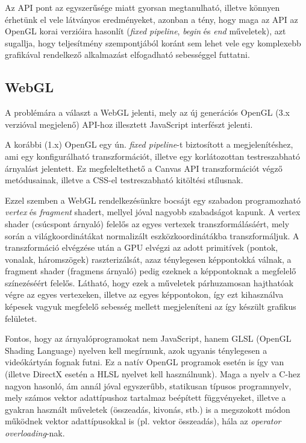 Az API pont az egyszerűsége miatt gyorsan megtanulható, illetve könnyen érhetünk
el vele látványos eredményeket, azonban a tény, hogy maga az API az OpenGL korai
verzióira hasonlít (\emph{fixed pipeline}, \emph{begin} és \emph{end}
műveletek), azt sugallja, hogy teljesítmény szempontjából koránt sem lehet vele
egy komplexebb grafikával rendelkező alkalmazást elfogadható sebességgel
futtatni.

\subsection{WebGL}

A problémára a választ a WebGL\cite{webgl} jelenti, mely az új generációs OpenGL
(3.x verzióval megjelenő) API-hoz illesztett JavaScript interfészt jelenti.

A korábbi (1.x) OpenGL egy ún. \emph{fixed pipeline}-t biztosított a
megjelenítéshez, ami egy konfigurálható transzformációt, illetve egy
korlátozottan testreszabható árnyalást jelentett. Ez megfeleltethető a Canvas
API transzformációt végző metódusainak, illetve a CSS-el testreszabható
kitöltési stílusnak.

Ezzel szemben a WebGL rendelkezésünkre bocsájt egy szabadon programozható
\emph{vertex} és \emph{fragment} shadert, mellyel jóval nagyobb szabadságot
kapunk. A vertex shader (csúcspont árnyaló) felelős az egyes vertexek
transzformálásáért, mely során a világkoordinátákat normalizált
eszközkoordinátákba transzformáljuk. A transzformáció elvégzése után a GPU
elvégzi az adott primitívek (pontok, vonalak, háromszögek) raszterizálsát, azaz
ténylegesen képpontokká válnak, a fragment shader (fragmens árnyaló) pedig
ezeknek a képpontoknak a megfelelő színezéséért felelős. Látható, hogy ezek a
műveletek párhuzamosan hajthatóak végre az egyes vertexeken, illetve az egyes
képpontokon, így ezt kihasználva képesek vagyuk megfelelő sebesség mellett
megjeleníteni az így készült grafikus felületet.

Fontos, hogy az árnyalóprogramokat nem JavaScript, hanem GLSL (OpenGL Shading
Language\cite{glsl}) nyelven kell megírnunk, azok ugyanis ténylegesen a
videókártyán fognak futni. Ez a natív OpenGL programok esetén is így van
(illetve DirectX esetén a HLSL nyelvet kell használnunk\cite{hlsl}). Maga a
nyelv a C-hez nagyon hasonló, ám annál jóval egyszerűbb, statikusan típusos
programnyelv, mely számos vektor adattípushoz tartalmaz beépített függvényeket,
illetve a gyakran használt műveletek (összeadás, kivonás, stb.) is a megszokott
módon működnek vektor adattípusokkal is (pl. vektor összeadás), hála az
\emph{operator overloading}-nak.

